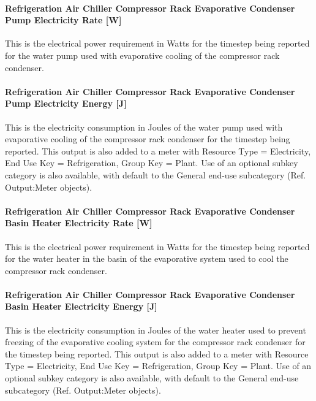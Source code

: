 \paragraph{Refrigeration Air Chiller Compressor Rack Evaporative Condenser Pump Electricity Rate {[}W{]}}\label{refrigeration-air-chiller-compressor-rack-evaporative-condenser-pump-electric-power-w}

This is the electrical power requirement in Watts for the timestep being reported for the water pump used with evaporative cooling of the compressor rack condenser.

\paragraph{Refrigeration Air Chiller Compressor Rack Evaporative Condenser Pump Electricity Energy {[}J{]}}\label{refrigeration-air-chiller-compressor-rack-evaporative-condenser-pump-electric-energy-j}

This is the electricity consumption in Joules of the water pump used with evaporative cooling of the compressor rack condenser for the timestep being reported. This output is also added to a meter with Resource Type = Electricity, End Use Key = Refrigeration, Group Key = Plant. Use of an optional subkey category is also available, with default to the General end-use subcategory (Ref. Output:Meter objects).

\paragraph{Refrigeration Air Chiller Compressor Rack Evaporative Condenser Basin Heater Electricity Rate {[}W{]}}\label{refrigeration-air-chiller-compressor-rack-evaporative-condenser-basin-heater-electric-power-w}

This is the electrical power requirement in Watts for the timestep being reported for the water heater in the basin of the evaporative system used to cool the compressor rack condenser.

\paragraph{Refrigeration Air Chiller Compressor Rack Evaporative Condenser Basin Heater Electricity Energy {[}J{]}}\label{refrigeration-air-chiller-compressor-rack-evaporative-condenser-basin-heater-electric-energy-j}

This is the electricity consumption in Joules of the water heater used to prevent freezing of the evaporative cooling system for the compressor rack condenser for the timestep being reported. This output is also added to a meter with Resource Type = Electricity, End Use Key = Refrigeration, Group Key = Plant. Use of an optional subkey category is also available, with default to the General end-use subcategory (Ref. Output:Meter objects).


